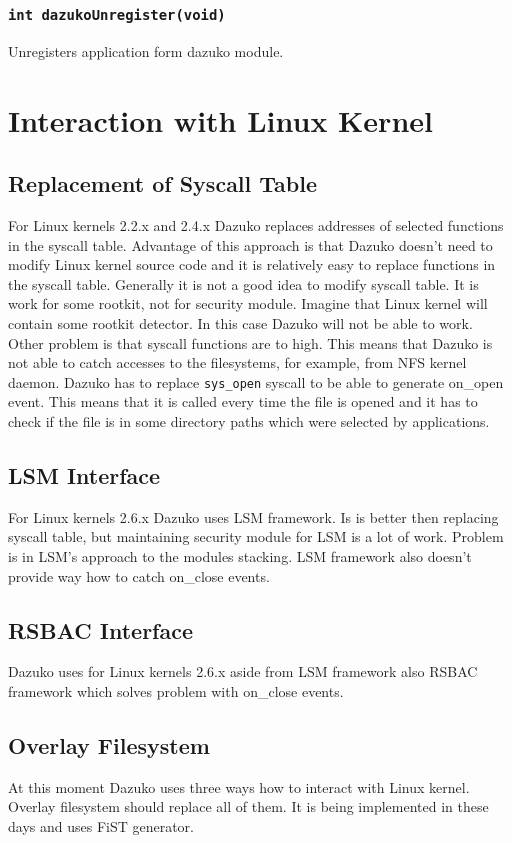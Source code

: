 \subsubsection{\texttt{int dazukoUnregister(void)}}
Unregisters application form dazuko module.


\section{Interaction with Linux Kernel}

\subsection{Replacement of Syscall Table}
For Linux kernels 2.2.x and 2.4.x Dazuko replaces addresses of selected functions in
the syscall table. Advantage of this approach is that Dazuko doesn't need to modify
Linux kernel source code and it is relatively easy to replace functions in the syscall
table. Generally it is not a good idea to modify syscall table. It is work for some
rootkit, not for security module. Imagine that Linux kernel will contain some rootkit
detector. In this case Dazuko will not be able to work. Other problem is that syscall
functions are to high. This means that Dazuko is not able to catch accesses to the
filesystems, for example, from NFS kernel daemon. Dazuko has to replace
\texttt{sys\_open} syscall to be able to generate on\_open event. This means that
it is called every time the file is opened and it has to check if the file is in some
directory paths which were selected by applications.

\subsection{LSM Interface}
For Linux kernels 2.6.x Dazuko uses LSM framework. Is is better then replacing syscall
table, but maintaining security module for LSM is a lot of work. Problem is in LSM's
approach to the modules stacking. LSM framework also doesn't provide way how to catch
on\_close events.

\subsection{RSBAC Interface}
Dazuko uses for Linux kernels 2.6.x aside from LSM framework also RSBAC framework
which solves problem with on\_close events.

\subsection{Overlay Filesystem}
At this moment Dazuko uses three ways how to interact with Linux kernel. Overlay
filesystem should replace all of them. It is being implemented in these days and uses FiST
generator.
